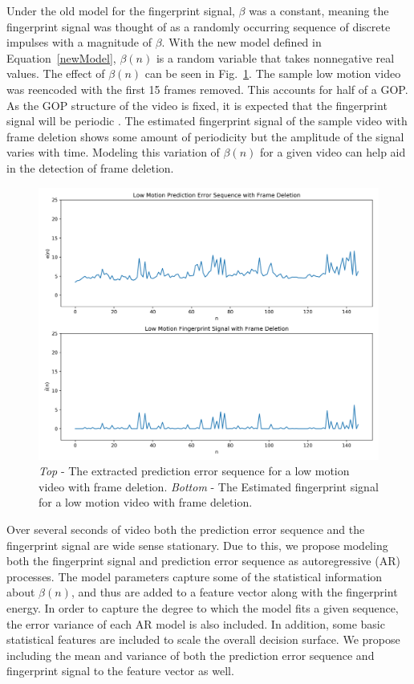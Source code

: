 Under the old model for the fingerprint signal, $\beta$ was a constant, meaning the fingerprint signal was thought of as a randomly occurring sequence of discrete impulses with a magnitude of $\beta$. With the new model defined in Equation~\ref{newModel}, $\beta(n)$ is a random variable that takes nonnegative real values. The effect of $\beta(n)$ can be seen in Fig.~\ref{fdelCompare}. The sample low motion video was reencoded with the first 15 frames removed. This accounts for half of a GOP. As the GOP structure of the video is fixed, it is expected that the fingerprint signal will be periodic \cite{stamm}. The estimated fingerprint signal of the sample video with frame deletion shows some amount of periodicity but the amplitude of the signal varies with time. Modeling this variation of $\beta(n)$ for a given video can help aid in the detection of frame deletion.

\begin{figure}[htbp]
\centerline{\includegraphics[width=0.75\linewidth]{ProposedApproach/perror_fdel_comparison.png}}
\caption{\emph{Top} - The extracted prediction error sequence for a low motion video with frame deletion. \emph{Bottom} - The Estimated fingerprint signal for a low motion video with frame deletion.}
\label{fdelCompare}
\end{figure}

Over several seconds of video both the prediction error sequence and the fingerprint signal are wide sense stationary. Due to this, we propose modeling both the fingerprint signal and prediction error sequence as autoregressive (AR) processes. The model parameters capture some of the statistical information about $\beta(n)$, and thus are added to a feature vector along with the fingerprint energy. In order to capture the degree to which the model fits a given sequence, the error variance of each AR model is also included. In addition, some basic statistical features are included to scale the overall decision surface. We propose including the mean and variance of both the prediction error sequence and fingerprint signal to the feature vector as well.

